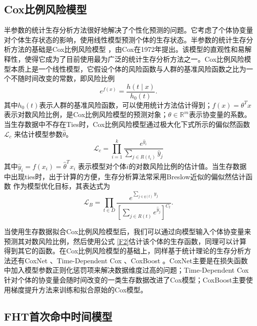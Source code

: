 \subsection{Cox比例风险模型}

半参数的统计生存分析方法很好地解决了个性化预测的问题。它考虑了个体协变量对个体生存状态的影响，使用线性模型预测个体的生存状态。半参数的统计生存分析方法的基础是Cox比例风险模型 ，由Cox在1972年提出。该模型的直观性和易解释性，使得它成为了目前使用最为广泛的统计生存分析方法之一。Cox比例风险模型本质上是一个线性模型，它假设个体的风险函数与人群的基准风险函数之比为一个不随时间改变的常数，即风险比例
\begin{equation}
e^{f(x)} =\frac{h(t\mid x)}{h_0 (t)}. \label{F4}
\end{equation}
其中$h_0 (t)$表示人群的基准风险函数，可以使用统计方法估计得到；$f(x)=\theta^T x$表示对数风险比例，是Cox比例风险模型的预测对象；$\theta \in \mathbb{R}^m$表示协变量的系数。当生存数据中不存在Ties时，Cox比例风险模型通过极大化下式所示的偏似然函数$\mathcal{L}_c$ 来估计模型参数$\hat{\theta}$。
\begin{equation}
\mathcal{L}_c = \prod_{i=1}^k \frac{e^{\hat{y}_i}}{\sum_{j\in R(t_i)} \hat{y}_j} \label{F5}
\end{equation}
其中$\hat{y}_i=f(x_i)=\hat{\theta}^T x_i$ 表示模型对个体$i$的对数风险比例的估计值。当生存数据中出现ties时，出于计算的方便，生存分析算法常采用Breslow近似的偏似然估计函数 作为模型优化目标，其表达式为
\begin{equation}
\mathcal{L}_B = \prod_{t\in D} \frac{e^{\sum_{j\in q(t)} \hat{y}_j}}{[\sum_{j\in R(t)} e^{\hat{y}_j}]^{C_t}}. \label{F6}
\end{equation}

当使用生存数据拟合Cox比例风险模型后，我们可以通过向模型输入个体协变量来预测其对数风险比例，然后使用公式 \eqref{F2}估计该个体的生存函数，同理可以计算得到其它的函数。在Cox比例风险模型的基础上，同样基于统计理论的生存分析方法还有CoxNet 、Time-Dependent Cox 、CoxBoost 。CoxNet主要是在损失函数中加入模型参数正则化惩罚项来解决数据维度过高的问题；Time-Dependent Cox针对个体的协变量会随时间改变的一类生存数据改进了Cox模型；CoxBoost主要使用梯度提升方法来训练和拟合原始的Cox模型。

\subsection{FHT首次命中时间模型}

